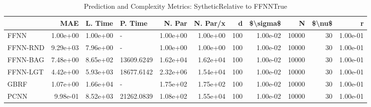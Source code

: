 \begin{table}
\centering
\caption{Prediction and Complexity Metrics: SytheticRelative to FFNNTrue}
\label{tab__Sythetic__Fix_Neurons_QTrue}
\begin{tabular}{lrrlrrrrrrr}
\toprule
{} &      MAE &  L. Time &     P. Time &   N. Par &  N. Par/x &    d &  \$\textbackslash sigma\$ &      N &  \$\textbackslash nu\$ &        r \\
\midrule
FFNN     & 1.00e+00 & 1.00e+00 &           - & 1.00e+00 &  1.00e+00 &  100 &  1.00e-02 &  10000 &     30 & 1.00e-01 \\
FFNN-RND & 9.29e+03 & 7.96e+00 &           - & 1.00e+00 &  1.00e+00 &  100 &  1.00e-02 &  10000 &     30 & 1.00e-01 \\
FFNN-BAG & 7.48e+00 & 8.65e+02 &  13609.6249 & 1.62e+04 &  1.62e+04 &  100 &  1.00e-02 &  10000 &     30 & 1.00e-01 \\
FFNN-LGT & 4.42e+00 & 5.93e+03 &  18677.6142 & 2.32e+06 &  1.54e+04 &  100 &  1.00e-02 &  10000 &     30 & 1.00e-01 \\
GBRF     & 1.07e+00 & 1.66e+04 &           - & 1.75e+02 &  1.75e+02 &  100 &  1.00e-02 &  10000 &     30 & 1.00e-01 \\
PCNN     & 9.98e-01 & 8.52e+03 &  21262.0839 & 1.08e+02 &  1.55e+04 &  100 &  1.00e-02 &  10000 &     30 & 1.00e-01 \\
\bottomrule
\end{tabular}
\end{table}
